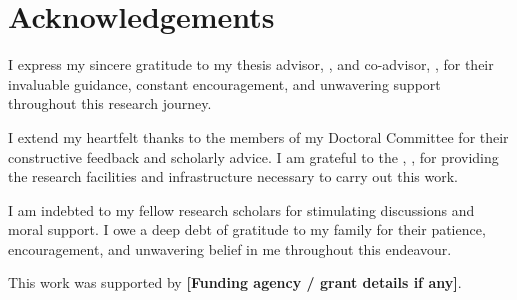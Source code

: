 
\chapter*{Acknowledgements}
\thispagestyle{plain}

I express my sincere gratitude to my thesis advisor,
\textbf{\SupervisorName}, and co-advisor, \textbf{\CoSupervisorName},
for their invaluable guidance, constant encouragement, and unwavering support
throughout this research journey.

I extend my heartfelt thanks to the members of my Doctoral Committee for their
constructive feedback and scholarly advice. I am grateful to the
\textbf{\DeptName}, \textbf{\UniversityName}, \textbf{\CampusName} for
providing the research facilities and infrastructure necessary to carry out
this work.

I am indebted to my fellow research scholars for stimulating discussions and
moral support. I owe a deep debt of gratitude to my family for their patience,
encouragement, and unwavering belief in me throughout this endeavour.

This work was supported by \textbf{[Funding agency / grant details if any]}.

\vspace{2cm}
\begin{flushright}
  \textbf{\AuthorName}\\
  \AuthorRegNo\\
  \DeptName\\
  \UniversityName\\
  \SubmissionDate
\end{flushright}
